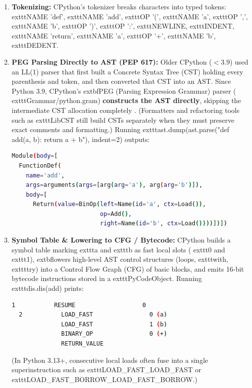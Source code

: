 \begin{enumerate}[leftmargin=15pt]
  \item \textbf{Tokenizing:} CPython's tokenizer breaks characters into typed tokens:
  	exttt{NAME 'def'}, 	exttt{NAME 'add'}, 	exttt{OP '('}, 	exttt{NAME 'a'}, 	exttt{OP ','}, 	exttt{NAME 'b'}, 	exttt{OP ')'}, 	exttt{OP ':'}, 	exttt{NEWLINE}, 	exttt{INDENT}, 	exttt{NAME 'return'}, 	exttt{NAME 'a'}, 	exttt{OP '+'}, 	exttt{NAME 'b'}, 	exttt{DEDENT}.
  \item \textbf{PEG Parsing Directly to AST (PEP 617):} Older CPython ($<3.9$) used an LL(1) parser that first built a Concrete Syntax Tree (CST) holding every parenthesis and token, and then converted that CST into an AST. Since Python 3.9, CPython's 	extbf{PEG (Parsing Expression Grammar) parser} (	exttt{Grammar/python.gram}) \textbf{constructs the AST directly}, skipping the intermediate CST allocation completely \cite{pep617}. (Formatters and refactoring tools such as 	exttt{LibCST} still build CSTs separately when they must preserve exact comments and formatting.) Running 	exttt{ast.dump(ast.parse("def add(a, b): return a + b"), indent=2)} outputs:
\begin{lstlisting}[language=sh]
Module(body=[
  FunctionDef(
    name='add',
    args=arguments(args=[arg(arg='a'), arg(arg='b')]),
    body=[
      Return(value=BinOp(left=Name(id='a', ctx=Load()),
                         op=Add(),
                         right=Name(id='b', ctx=Load())))])])
\end{lstlisting}
  \item \textbf{Symbol Table \& Lowering to CFG / Bytecode:} CPython builds a symbol table marking 	exttt{a} and 	exttt{b} as fast local slots (	exttt{0} and 	exttt{1}), 	extbf{lowers} high-level AST control structures (loops, 	exttt{with}, 	exttt{try}) into a Control Flow Graph (CFG) of basic blocks, and emits 16-bit bytecode instructions stored in a 	exttt{PyCodeObject}. Running 	exttt{dis.dis(add)} prints:
\begin{lstlisting}[language=sh]
  1           RESUME                   0
  2           LOAD_FAST                0 (a)
              LOAD_FAST                1 (b)
              BINARY_OP                0 (+)
              RETURN_VALUE
\end{lstlisting}
  (In Python 3.13+, consecutive local loads often fuse into a single superinstruction such as 	exttt{LOAD\_FAST\_LOAD\_FAST} or 	exttt{LOAD\_FAST\_BORROW\_LOAD\_FAST\_BORROW}.)
\end{enumerate}

